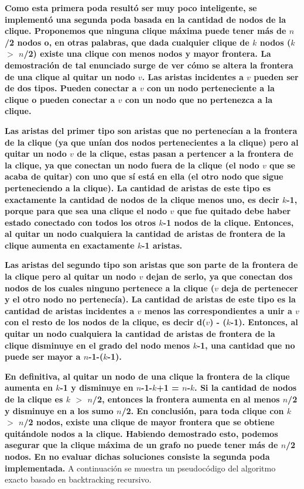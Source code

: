 \par{\textbf{Como esta primera poda resultó ser muy poco inteligente, se
implementó una segunda poda basada en la cantidad de nodos de la clique.
Proponemos que ninguna clique máxima puede tener más de $n$/2 nodos o, en otras
palabras, que dada cualquier clique de $k$ nodos ($k$ $>$ $n$/2) existe una
clique con menos nodos y mayor frontera. La demostración de tal enunciado
surge de ver cómo se altera la frontera de una clique al quitar un nodo $v$. Las
aristas incidentes a $v$ pueden ser de dos tipos. Pueden conectar a $v$
con un nodo perteneciente a la clique o pueden conectar a $v$ con un
nodo que no pertenezca a la clique.}}\\

\par{\textbf{Las aristas del primer tipo son aristas que no pertenecían a la
frontera de la clique (ya que unían dos nodos pertenecientes a la clique)
pero al quitar un nodo $v$ de la clique, estas pasan a
pertencer a la frontera de la clique, ya que conectan un nodo fuera de la
clique (el nodo $v$ que se acaba de quitar) con uno que sí está en ella (el
otro nodo que sigue perteneciendo a la clique). La cantidad de aristas de este
tipo es exactamente la cantidad de nodos de la clique menos uno,
es decir $k$-1, porque para que sea una clique el nodo $v$ que fue quitado debe
haber estado conectado con todos los otros $k$-1 nodos de la clique. Entonces,
al quitar un nodo cualquiera la cantidad de aristas de frontera de la clique
aumenta en exactamente $k$-1 aristas.}}\\

\par{\textbf{Las aristas del segundo tipo son aristas que son parte de la
frontera de la clique pero al quitar un nodo $v$ dejan de serlo, ya que
conectan dos nodos de los cuales ninguno pertenece a la clique ($v$ deja de
pertenecer y el otro nodo no pertenecía). La cantidad de aristas de este tipo
es la cantidad de aristas incidentes a $v$ menos las correspondientes a unir
a $v$ con el resto de los nodos de la clique, es decir d($v$) - ($k$-1).
Entonces, al quitar un nodo cualquiera la cantidad de aristas de frontera de la
clique disminuye en el grado del nodo menos $k$-1, una cantidad que no puede
ser mayor a $n$-1-($k$-1).}}\\

\par{\textbf{En definitiva, al quitar un nodo de una clique la frontera de la
clique aumenta en $k$-1 y disminuye en $n$-1-$k$+1 = $n$-$k$. Si la cantidad de
nodos de la clique es $k$ $>$ $n$/2, entonces la frontera aumenta en al menos
$n$/2 y disminuye en a los sumo $n$/2. En conclusión, para toda clique con $k$
$>$ $n$/2 nodos, existe una clique de mayor frontera que se obtiene quitándole
nodos a la clique. Habiendo demostrado esto, podemos asegurar que la clique
máxima de un grafo no puede tener más de $n$/2 nodos. En no evaluar dichas
soluciones consiste la segunda poda implementada.} {\color{dGray}A continuación
se muestra un pseudocódigo del algoritmo exacto basado en backtracking
recursivo.}}\\

